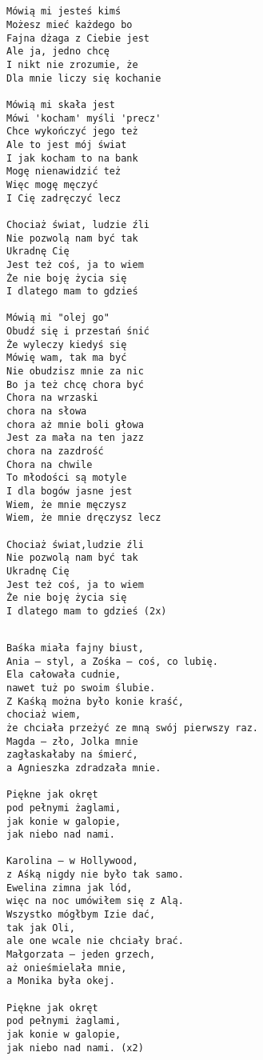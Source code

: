 \documentclass[12pt]{article}
\begin{document}
\subsection*{}
\begin{verbatim}
Mówią mi jesteś kimś
Możesz mieć każdego bo
Fajna dżaga z Ciebie jest
Ale ja, jedno chcę
I nikt nie zrozumie, że
Dla mnie liczy się kochanie

Mówią mi skała jest
Mówi 'kocham' myśli 'precz'
Chce wykończyć jego też
Ale to jest mój świat
I jak kocham to na bank
Mogę nienawidzić też
Więc mogę męczyć
I Cię zadręczyć lecz

Chociaż świat, ludzie źli
Nie pozwolą nam być tak
Ukradnę Cię
Jest też coś, ja to wiem
Że nie boję życia się
I dlatego mam to gdzieś

Mówią mi "olej go"
Obudź się i przestań śnić
Że wyleczy kiedyś się
Mówię wam, tak ma być
Nie obudzisz mnie za nic
Bo ja też chcę chora być
Chora na wrzaski
chora na słowa
chora aż mnie boli głowa
Jest za mała na ten jazz
chora na zazdrość
Chora na chwile
To młodości są motyle
I dla bogów jasne jest
Wiem, że mnie męczysz
Wiem, że mnie dręczysz lecz

Chociaż świat,ludzie źli
Nie pozwolą nam być tak
Ukradnę Cię
Jest też coś, ja to wiem
Że nie boję życia się
I dlatego mam to gdzieś (2x)
\end{verbatim}
\clearpage

\subsection*{}
\begin{verbatim}
Baśka miała fajny biust,
Ania – styl, a Zośka – coś, co lubię.
Ela całowała cudnie,
nawet tuż po swoim ślubie.
Z Kaśką można było konie kraść,
chociaż wiem,
że chciała przeżyć ze mną swój pierwszy raz.
Magda – zło, Jolka mnie
zagłaskałaby na śmierć,
a Agnieszka zdradzała mnie.

Piękne jak okręt
pod pełnymi żaglami,
jak konie w galopie,
jak niebo nad nami.

Karolina – w Hollywood,
z Aśką nigdy nie było tak samo.
Ewelina zimna jak lód,
więc na noc umówiłem się z Alą.
Wszystko mógłbym Izie dać,
tak jak Oli,
ale one wcale nie chciały brać.
Małgorzata – jeden grzech,
aż onieśmielała mnie,
a Monika była okej.

Piękne jak okręt
pod pełnymi żaglami,
jak konie w galopie,
jak niebo nad nami. (x2)
\end{verbatim}
\clearpage
\end{document}

